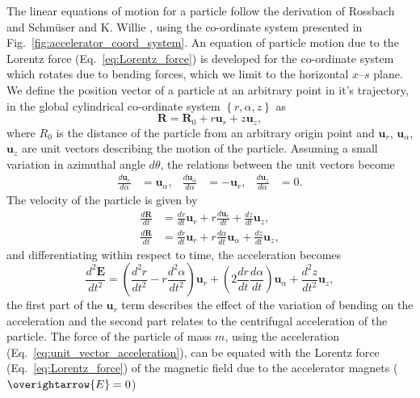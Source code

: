 \documentclass[../main.tex]{subfiles}
\begin{document}
The linear equations of motion for a particle follow the derivation of Rossbach and Schm\"{u}ser \cite{rossbach1993basic} and K. Willie \cite{wille2000physics}, using the co-ordinate system presented in Fig.~\ref{fig:accelerator_coord_system}. An equation of particle motion due to the Lorentz force (Eq.~\ref{eq:Lorentz_force}) is developed for the co-ordinate system which rotates due to bending forces, which we limit to the horizontal $x$--$s$ plane. We define the position vector of a particle at an arbitrary point in it's trajectory, in the global cylindrical co-ordinate system $\left\{r,\alpha,z\right\}$ as
\begin{equation}
\boldsymbol{R} = \boldsymbol{R}_{0} + r\boldsymbol{u}_{r} + z\boldsymbol{u}_{z},    
\label{eq:particle_position_vector}
\end{equation}
where $R_{0}$ is the distance of the particle from an arbitrary origin point and $\boldsymbol{u}_{r}$, $\boldsymbol{u}_{\alpha}$, $\boldsymbol{u}_{z}$ are unit vectors describing the motion of the particle. Assuming a small variation in azimuthal angle $d\theta$, the relations between the unit vectors become
\begin{align}
\frac{d\boldsymbol{u}_{r}}{d\alpha} &= \boldsymbol{u}_{\alpha}, & \frac{d\boldsymbol{u}_{\alpha}}{d\alpha} &= -\boldsymbol{u}_{r}, & \frac{d\boldsymbol{u}_{z}}{d\alpha} &= 0.
\label{eq:unit_vector_angular_derivatives}    
\end{align}
The velocity of the particle is given by
\begin{align}
\frac{d\boldsymbol{R}}{dt} &= \frac{dr}{dt}\boldsymbol{u}_{r}+r\frac{d\boldsymbol{u}_{r}}{dt} +\frac{dz}{dt}\boldsymbol{u}_{z}, \nonumber \\
\frac{d\boldsymbol{R}}{dt} &= \frac{dr}{dt}\boldsymbol{u}_{r} + r\frac{d\alpha}{dt}\boldsymbol{u}_{\alpha} + \frac{dz}{dt}\boldsymbol{u}_{z},
\label{eq:unit_vector_velocity}    
\end{align}
and differentiating within respect to time, the acceleration becomes
\begin{equation}
\frac{d^{2}\boldsymbol{E}}{dt^{2}} = \left(\frac{d^{2}r}{dt^{2}}-r\frac{d^{2}\alpha}{dt^{2}}\right)\boldsymbol{u}_{r} + \left(2\frac{dr}{dt}\frac{d\alpha}{dt}\right)\boldsymbol{u}_{\alpha} + \frac{d^{2}z}{dt^{2}}\boldsymbol{u}_{z},
\label{eq:unit_vector_acceleration}    
\end{equation}
the first part of the $\boldsymbol{u}_{r}$ term describes the effect of the variation of bending on the acceleration and the second part relates to the centrifugal acceleration of the particle. The force of the particle of mass $m$, using the acceleration (Eq.~\ref{eq:unit_vector_acceleration}), can be equated with the Lorentz force (Eq.~\ref{eq:Lorentz_force}) of the magnetic field due to the accelerator magnets ($\overightarrow{E}=0$)
\end{document}
